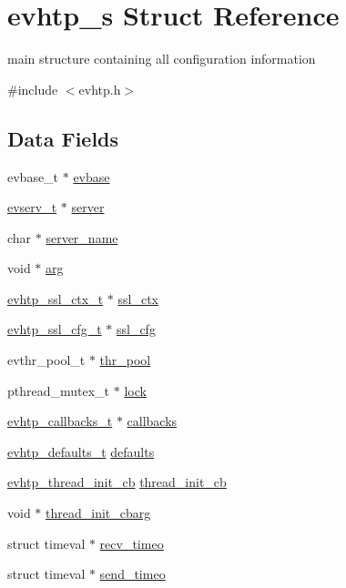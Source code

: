 \hypertarget{structevhtp__s}{
\section{evhtp\_\-s Struct Reference}
\label{structevhtp__s}
}


main structure containing all configuration information  




{\ttfamily \#include $<$evhtp.h$>$}

\subsection*{Data Fields}
\begin{DoxyCompactItemize}
\item 
evbase\_\-t $\ast$ \hyperlink{structevhtp__s_abc4ce26b166a97e5766105f253a4fe21}{evbase}
\item 
\hyperlink{evhtp_8h_accea3745ada200d1acc361354315579c}{evserv\_\-t} $\ast$ \hyperlink{structevhtp__s_adbf9415567b9a26229148539d64a5eda}{server}
\item 
char $\ast$ \hyperlink{structevhtp__s_a4e06dd572147d48785afd0439576487a}{server\_\-name}
\item 
void $\ast$ \hyperlink{structevhtp__s_a9ce2ec4812a92cb6ab39f6e81e9173a9}{arg}
\item 
\hyperlink{evhtp_8h_a3a45854457c03a9028160078945046da}{evhtp\_\-ssl\_\-ctx\_\-t} $\ast$ \hyperlink{structevhtp__s_a21d5d9eef41ecdb08b82db795aa6da98}{ssl\_\-ctx}
\item 
\hyperlink{structevhtp__ssl__cfg__s}{evhtp\_\-ssl\_\-cfg\_\-t} $\ast$ \hyperlink{structevhtp__s_afb6cdde78523e94fa84f57e55280513f}{ssl\_\-cfg}
\item 
evthr\_\-pool\_\-t $\ast$ \hyperlink{structevhtp__s_a350014aec537fdf8ef6f82efe17d5757}{thr\_\-pool}
\item 
pthread\_\-mutex\_\-t $\ast$ \hyperlink{structevhtp__s_a33586b4184d23f2b8f4df153ec23af13}{lock}
\item 
\hyperlink{structevhtp__callbacks__s}{evhtp\_\-callbacks\_\-t} $\ast$ \hyperlink{structevhtp__s_a43bc08d49284feb774b73ee06cf0a769}{callbacks}
\item 
\hyperlink{structevhtp__defaults__s}{evhtp\_\-defaults\_\-t} \hyperlink{structevhtp__s_a5ca39f6268aea8173dbdc0a1e297925b}{defaults}
\item 
\hyperlink{evhtp_8h_a162b617e19f372264cc22388dce03f2e}{evhtp\_\-thread\_\-init\_\-cb} \hyperlink{structevhtp__s_af7bcd46ddf1d6d7dde1383c28f746e97}{thread\_\-init\_\-cb}
\item 
void $\ast$ \hyperlink{structevhtp__s_aa7d8ed7967f5071085f57741dde79056}{thread\_\-init\_\-cbarg}
\item 
struct timeval $\ast$ \hyperlink{structevhtp__s_a20c86a275c0f940d56da7353e6d08264}{recv\_\-timeo}
\item 
struct timeval $\ast$ \hyperlink{structevhtp__s_ad997ef3d1566543f53f87120698c9ef4}{send\_\-timeo}
\end{DoxyCompactItemize}


